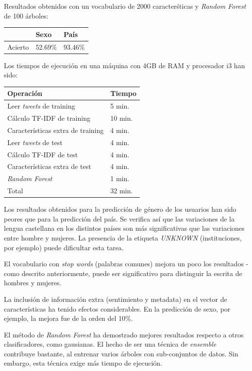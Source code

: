 \documentclass[11pt,a4paper]{article}
\begin{document}
  Resultados obtenidos con un vocabulario de 2000 caracter\'sticas y {\em Random Forest} de 100 \'arboles:
    \begin{center}
	\begin{tabular}{ l | l | l }
	  & Sexo  & Pa\'is\\ \hline
	  Acierto & 52.69\% & 93.46\% \\
	  \hline 
	\end{tabular}
    \end{center}
    
  Los tiempos de ejecuci\'on en una m\'aquina con 4GB de RAM y procesador i3 han sido:
    \begin{center}
	\begin{tabular}{ l | l }
	  Operaci\'on & Tiempo\\ \hline
	  Leer {\em tweets} de training & 5 min. \\
	  C\'alculo TF-IDF de training & 10 min. \\
	  Caracter\'isticas extra de training & 4 min. \\
	  Leer {\em tweets} de test & 4 min. \\
	  C\'alculo TF-IDF de test & 4 min. \\
	  Caracter\'isticas extra de test & 4 min. \\
	  {\em Random Forest} & 1 min. \\ \hline
	  Total & 32 min.
	\end{tabular}
    \end{center}
  
  
  Los resultados obtenidos para la predicci\'on de g\'enero de los usuarios han sido peores que para la predicci\'on del pa\'is. Se verifica as\'i que las variaciones de la lengua castellana en los distintos pa\'ises son m\'as significativas que las variaciones entre hombre y mujeres. La presencia de la etiqueta {\em UNKNOWN} (instituciones, por ejemplo) puede dificultar esta tarea. 

  El vocabulario con {\em stop words} (palabras comunes) mejora un poco los resultados - como descrito anteriormente, puede ser significativo para distinguir la escrita de hombres y mujeres. 

  La inclusi\'on de informaci\'on extra (sentimiento y metadata) en el vector de caracter\'isticas ha tenido efectos considerables. En la predicci\'on de sexo, por ejemplo, la mejora fue de la orden del 10\%. 

  El m\'etodo de {\em Random Forest} ha demostrado mejores resultados respecto a otros clasificadores, como gausianas. El hecho de ser una t\'ecnica de {\em ensemble} contribuye bastante, al entrenar varios \'arboles con sub-conjuntos de datos. Sin embargo, esta t\'ecnica exige m\'as tiempo de ejecuci\'on.
\end{document}
